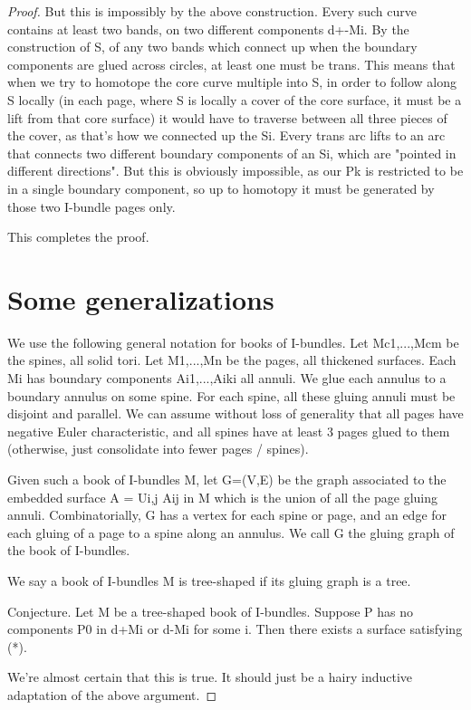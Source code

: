 \documentclass[12pt]{amsart}
\theoremstyle{definition}
\begin{document}
\begin{proof}
But this is impossibly by the above construction. Every such curve contains at
least two bands, on two different components d+-Mi. By the construction of S,
of any two bands which connect up when the boundary components are glued across
circles, at least one must be trans. This means that when we try to homotope
the core curve multiple into S, in order to follow along S locally (in each
page, where S is locally a cover of the core surface, it must be a lift from
that core surface) it would have to traverse between all three pieces of the
cover, as that's how we connected up the Si. Every trans arc lifts to an arc
that connects two different boundary components of an Si, which are "pointed in
different directions". But this is obviously impossible, as our Pk is
restricted to be in a single boundary component, so up to homotopy it must be
generated by those two I-bundle pages only.

This completes the proof.

\section{Some generalizations}

We use the following general notation for books of I-bundles. Let Mc1,...,Mcm
be the spines, all solid tori. Let M1,...,Mn be the pages, all thickened
surfaces. Each Mi has boundary components Ai1,...,Aiki all annuli. We glue each
annulus to a boundary annulus on some spine. For each spine, all these gluing
annuli must be disjoint and parallel. We can assume without loss of generality
that all pages have negative Euler characteristic, and all spines have at least
3 pages glued to them (otherwise, just consolidate into fewer pages / spines).

Given such a book of I-bundles M, let G=(V,E) be the graph associated to the
embedded surface A = Ui,j Aij in M which is the union of all the page gluing
annuli. Combinatorially, G has a vertex for each spine or page, and an edge for
each gluing of a page to a spine along an annulus. We call G the gluing graph
of the book of I-bundles.

We say a book of I-bundles M is tree-shaped if its gluing graph is a tree.

Conjecture. Let M be a tree-shaped book of I-bundles. Suppose P has no
components P0 in d+Mi or d-Mi for some i. Then there exists a surface
satisfying (*).

We're almost certain that this is true. It should just be a hairy inductive
adaptation of the above argument.


\end{proof}
\end{document}
